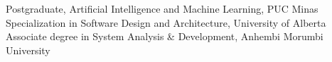 
\begin{scholarship}
					{Postgraduate, Artificial Intelligence and Machine Learning, PUC Minas}
					{Specialization in Software Design and Architecture, University of Alberta}
					{Associate degree in System Analysis \& Development, Anhembi Morumbi University}
\end{scholarship}